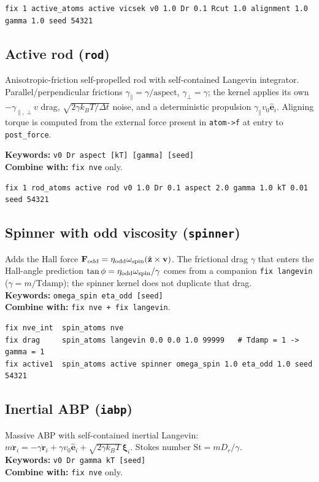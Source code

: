 \documentclass[11pt,a4paper]{article}
\begin{document}
\begin{lstlisting}
fix 1 active_atoms active vicsek v0 1.0 Dr 0.1 Rcut 1.0 alignment 1.0 gamma 1.0 seed 54321
\end{lstlisting}

\subsection{Active rod (\texttt{rod})}
Anisotropic-friction self-propelled rod with self-contained Langevin
integrator.  Parallel/perpendicular frictions
$\gamma_\parallel=\gamma/\mathrm{aspect}$, $\gamma_\perp=\gamma$; the kernel
applies its own $-\gamma_{\parallel,\perp}v$ drag, $\sqrt{2\gamma k_BT/\Delta t}$
noise, and a deterministic propulsion $\gamma_\parallel v_0\hat{\mathbf e}_i$.
Aligning torque is computed from the external force present in
\texttt{atom->f} at entry to \texttt{post\_force}.

\noindent
\textbf{Keywords:} \texttt{v0 Dr aspect [kT] [gamma] [seed]}\\
\textbf{Combine with:} \texttt{fix nve} only.

\begin{lstlisting}
fix 1 rod_atoms active rod v0 1.0 Dr 0.1 aspect 2.0 gamma 1.0 kT 0.01 seed 54321
\end{lstlisting}

\subsection{Spinner with odd viscosity (\texttt{spinner})}
Adds the Hall force $\mathbf F_{\rm odd}=\eta_{\rm odd}\omega_{\rm spin}(\hat{\mathbf z}\times\mathbf v)$.
The frictional drag $\gamma$ that enters the Hall-angle prediction
$\tan\phi=\eta_{\rm odd}\omega_{\rm spin}/\gamma$ comes from a companion
\texttt{fix langevin} ($\gamma=m/\mathrm{Tdamp}$); the spinner kernel does
not duplicate that drag.\\
\textbf{Keywords:} \texttt{omega\_spin eta\_odd [seed]}\\
\textbf{Combine with:} \texttt{fix nve + fix langevin}.

\begin{lstlisting}
fix nve_int  spin_atoms nve
fix drag     spin_atoms langevin 0.0 0.0 1.0 99999   # Tdamp = 1 -> gamma = 1
fix active1  spin_atoms active spinner omega_spin 1.0 eta_odd 1.0 seed 54321
\end{lstlisting}

\subsection{Inertial ABP (\texttt{iabp})}
Massive ABP with self-contained inertial Langevin:
$m\ddot{\mathbf r}_i = -\gamma\dot{\mathbf r}_i + \gamma v_0\hat{\mathbf e}_i
+\sqrt{2\gamma k_BT}\,\boldsymbol\xi_i$.  Stokes number
$\mathrm{St}=mD_r/\gamma$.\\
\textbf{Keywords:} \texttt{v0 Dr gamma kT [seed]}\\
\textbf{Combine with:} \texttt{fix nve} only.
\end{document}
